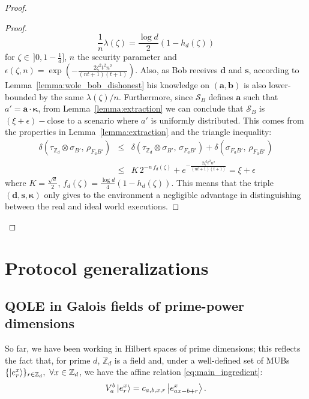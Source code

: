 \begin{proof}
\begin{proof}
$$\frac{1}{n}\lambda(\zeta) = \frac{\log d}{2}(1-h_d(\zeta))$$
for $\zeta\in\,]0, 1-\frac{1}{d}]$, $n$ the security parameter and $\epsilon(\zeta, n) = \exp( -\frac{2 \zeta^2t^2n^2}{(nt+1)(t+1)})$. Also, as Bob receives $\bm{d}$ and $\bm{s}$, according to Lemma~\ref{lemma:wole_bob_dishonest} his knowledge on $(\bm{a}, \bm{b})$ is also lower-bounded by the same $\lambda(\zeta)/n$. Furthermore, since $\mathcal{S}_B$ defines $\bm{a}$ such that $a' = \bm{a} \cdot \bm{\kappa}$, from Lemma~\ref{lemma:extraction} we can conclude that $\mathcal{S}_B$ is $(\xi + \epsilon)-$close to a scenario where $a'$ is uniformly distributed. This comes from the properties in Lemma~\ref{lemma:extraction} and the triangle inequality:
\begin{eqnarray*}
\delta( \tau_{\mathbb{Z}_d} \otimes \sigma_{B'},\, \rho_{F_a B'} ) &\leq& \delta( \tau_{\mathbb{Z}_d} \otimes \sigma_{B'},\, \sigma_{F_{a} B'} ) + \delta( \sigma_{F_{a} B'},\, \rho_{F_a B'} ) \\
&\leq& K\, 2^{-n \, f_d(\zeta)} + e^{ -\frac{2 \zeta^2t^2n^2}{(nt+1)(t+1)}}= \xi + \epsilon
\end{eqnarray*}
where $K = \frac{\sqrt{d}}{2}$, $f_d(\zeta) = \frac{\log d}{4} (1-h_d(\zeta))$. This means that the triple $(\bm{d}, \bm{s}, \bm{\kappa})$ only gives to the environment a negligible advantage in distinguishing between the real and ideal world executions.
\end{proof}
\end{proof}


\section{Protocol generalizations}
\label{sec:protgeneral}

\subsection{QOLE in Galois fields of prime-power dimensions} \label{sec:galois_ext}

So far, we have been working in Hilbert spaces of prime dimensions; this reflects the fact that, for prime $d$,  $\mathbb{Z}_d$ is a field  and, under a well-defined set of MUBs $\{ \ket{e^x_r} \}_{r\in\mathbb{Z}_d},\ \forall x\in\mathbb{Z}_d$, we have the affine relation \eqref{eq:main_ingredient}:
\begin{equation*}
V^b_a \ket{e^x_r} = c_{a, b, x, r} \ket{e^x_{ax - b +r}}.
\end{equation*}

